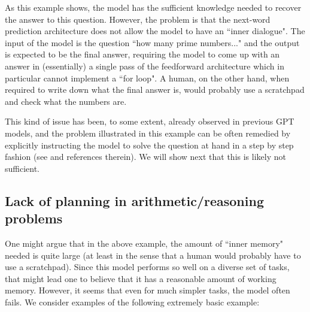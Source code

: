 As this example shows, the model has the sufficient knowledge needed to recover the answer to this question. However, the problem is that the next-word prediction architecture does not allow the model to have an ``inner dialogue". The input of the model is the question ``how many prime numbers..." and the output is expected to be the final answer, requiring the model to come up with an answer in (essentially) a single pass of the feedforward architecture which in particular cannot implement a ``for loop". A human, on the other hand, when required to write down what the final answer is, would probably use a scratchpad and check what the numbers are.




This kind of issue has been, to some extent, already observed in previous GPT models, and the problem illustrated in this example can be often remedied by explicitly instructing the model to solve the question at hand in a step by step fashion (see \cite{wei2022chain} and references therein). We will show next that this is likely not sufficient.

\subsection{Lack of planning in arithmetic/reasoning problems}
One might argue that in the above example, the amount of ``inner memory" needed is quite large (at least in the sense that a human would probably have to use a scratchpad). Since this model performs so well on a diverse set of tasks, that might lead one to believe that it has a reasonable amount of working memory. However, it seems that even for much simpler tasks, the model often fails. We consider examples of the following extremely basic example: 

